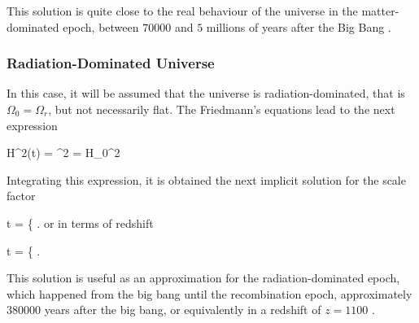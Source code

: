 This solution is quite close to the real behaviour of the universe in the 
matter-dominated epoch, between $70000$ and $5$ millions of years after 
the Big Bang \cite{padmanabhan1995}.



			\subsubsection*{Radiation-Dominated Universe}


In this case, it will be assumed that the universe is radiation-dominated, 
that is $\Omega_0 = \Omega_r$, but not necessarily flat. The Friedmann's 
equations lead to the next expression



{ H^2(t) = ^2 = H_0^2  }


Integrating this expression, it is obtained the next implicit solution for
the scale factor


{ t = \left\{   \right. }
or in terms of redshift



{ t = \left\{   \right. }


This solution is useful as an approximation for the radiation-dominated 
epoch, which happened from the big bang until the recombination epoch, 
approximately $380 000$ years after the big bang, or equivalently in a
redshift of $z = 1100$ \cite{padmanabhan1995}.



